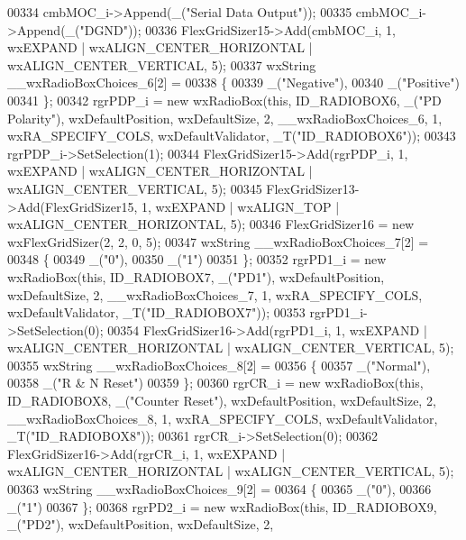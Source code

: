 \begin{DoxyCode}
00334     cmbMOC\_i->Append(\_(\textcolor{stringliteral}{"Serial Data Output"}));
00335     cmbMOC\_i->Append(\_(\textcolor{stringliteral}{"DGND"}));
00336     FlexGridSizer15->Add(cmbMOC\_i, 1, wxEXPAND | wxALIGN\_CENTER\_HORIZONTAL | wxALIGN\_CENTER\_VERTICAL, 5);
00337     wxString \_\_wxRadioBoxChoices\_6[2] =
00338     \{
00339         \_(\textcolor{stringliteral}{"Negative"}),
00340         \_(\textcolor{stringliteral}{"Positive"})
00341     \};
00342     rgrPDP\_i = \textcolor{keyword}{new} wxRadioBox(\textcolor{keyword}{this}, ID\_RADIOBOX6, \_(\textcolor{stringliteral}{"PD Polarity"}), wxDefaultPosition, wxDefaultSize, 2, 
      \_\_wxRadioBoxChoices\_6, 1, wxRA\_SPECIFY\_COLS, wxDefaultValidator, _T(\textcolor{stringliteral}{"ID\_RADIOBOX6"}));
00343     rgrPDP\_i->SetSelection(1);
00344     FlexGridSizer15->Add(rgrPDP\_i, 1, wxEXPAND | wxALIGN\_CENTER\_HORIZONTAL | wxALIGN\_CENTER\_VERTICAL, 5);
00345     FlexGridSizer13->Add(FlexGridSizer15, 1, wxEXPAND | wxALIGN\_TOP | wxALIGN\_CENTER\_HORIZONTAL, 5);
00346     FlexGridSizer16 = \textcolor{keyword}{new} wxFlexGridSizer(2, 2, 0, 5);
00347     wxString \_\_wxRadioBoxChoices\_7[2] =
00348     \{
00349         \_(\textcolor{stringliteral}{"0"}),
00350         \_(\textcolor{stringliteral}{"1"})
00351     \};
00352     rgrPD1\_i = \textcolor{keyword}{new} wxRadioBox(\textcolor{keyword}{this}, ID\_RADIOBOX7, \_(\textcolor{stringliteral}{"PD1"}), wxDefaultPosition, wxDefaultSize, 2, 
      \_\_wxRadioBoxChoices\_7, 1, wxRA\_SPECIFY\_COLS, wxDefaultValidator, _T(\textcolor{stringliteral}{"ID\_RADIOBOX7"}));
00353     rgrPD1\_i->SetSelection(0);
00354     FlexGridSizer16->Add(rgrPD1\_i, 1, wxEXPAND | wxALIGN\_CENTER\_HORIZONTAL | wxALIGN\_CENTER\_VERTICAL, 5);
00355     wxString \_\_wxRadioBoxChoices\_8[2] =
00356     \{
00357         \_(\textcolor{stringliteral}{"Normal"}),
00358         \_(\textcolor{stringliteral}{"R & N Reset"})
00359     \};
00360     rgrCR\_i = \textcolor{keyword}{new} wxRadioBox(\textcolor{keyword}{this}, ID\_RADIOBOX8, \_(\textcolor{stringliteral}{"Counter Reset"}), wxDefaultPosition, wxDefaultSize, 2, 
      \_\_wxRadioBoxChoices\_8, 1, wxRA\_SPECIFY\_COLS, wxDefaultValidator, _T(\textcolor{stringliteral}{"ID\_RADIOBOX8"}));
00361     rgrCR\_i->SetSelection(0);
00362     FlexGridSizer16->Add(rgrCR\_i, 1, wxEXPAND | wxALIGN\_CENTER\_HORIZONTAL | wxALIGN\_CENTER\_VERTICAL, 5);
00363     wxString \_\_wxRadioBoxChoices\_9[2] =
00364     \{
00365         \_(\textcolor{stringliteral}{"0"}),
00366         \_(\textcolor{stringliteral}{"1"})
00367     \};
00368     rgrPD2\_i = \textcolor{keyword}{new} wxRadioBox(\textcolor{keyword}{this}, ID\_RADIOBOX9, \_(\textcolor{stringliteral}{"PD2"}), wxDefaultPosition, wxDefaultSize, 2, 

\end{DoxyCode}
